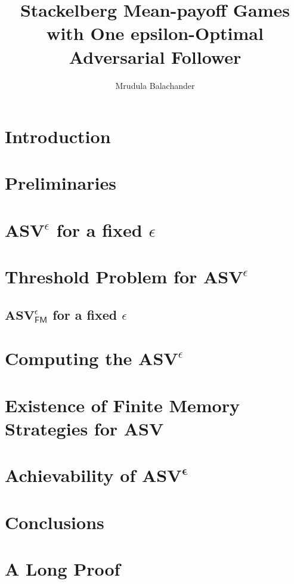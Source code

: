 \documentclass{report}
\begin{document}
\title{Stackelberg Mean-payoff Games with One epsilon-Optimal Adversarial Follower}
\author{Mrudula Balachander}
 
\beforepreface
{}
	
	
\afterpreface

\chapter{Introduction}
	\label{sec:intro}
	

\chapter{Preliminaries}
  	\label{sec:prelim}
  	

\chapter{$\mathbf{ASV}^{\epsilon}$ for a fixed $\epsilon$}
	\label{sec:examples}
	

\chapter{Threshold Problem for $\mathbf{ASV}^{\epsilon}$}
	\label{sec:ThresholdProblem}
	
	\section{$\mathbf{ASV}^{\epsilon}_{\mathsf{FM}}$ for a fixed $\epsilon$}
		\label{sec:FMStrategy}
		

\chapter{Computing the $\mathbf{ASV}^{\epsilon}$}
	\label{sec:ComputeASV}
	

\chapter{Existence of Finite Memory Strategies for ASV}
	\label{sec:FMASV}
	

\chapter{Achievability of $\mathbf{ASV^{\epsilon}}$}
	\label{sec:Achievability}
	

\chapter{Conclusions}


\appendix
	\chapter{A Long Proof}
		


	
\end{document}
